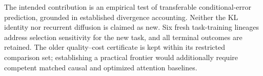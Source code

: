The intended contribution is an empirical test of transferable conditional-error
prediction, grounded in established divergence accounting. Neither the KL
identity nor recurrent diffusion is claimed as new. Six fresh task-training
lineages address selection sensitivity for the new task, and all terminal
outcomes are retained. The older quality--cost certificate is kept within its
restricted comparison set; establishing a practical frontier would additionally
require competent matched causal and optimized attention baselines.
